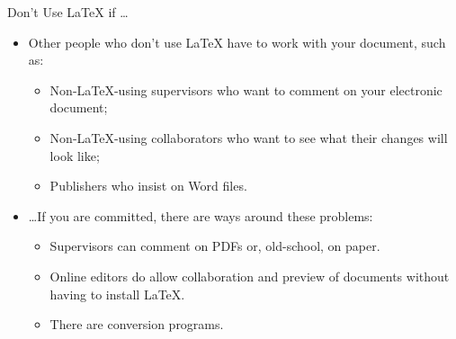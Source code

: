 \begin{frame}[fragile]{Don't Use \LaTeX{} if \dots}

\begin{itemize}
\item Other people who don't use \LaTeX{} have to work with your 
document, such as:
\begin{itemize}
\item Non-\LaTeX-using supervisors who want to comment on your 
electronic document;
\item Non-\LaTeX-using collaborators who want to see what their 
changes will look like;
\item {\color{red} Publishers who insist on Word files.}
\end{itemize}
\item \dots If you are committed, there are ways around these problems:
\begin{itemize}
\item Supervisors can comment on PDFs or, old-school, on paper.
\item Online editors do allow collaboration and preview of documents
  without having to install \LaTeX.
\item There are conversion programs.
\end{itemize}
\end{itemize}

\end{frame}

